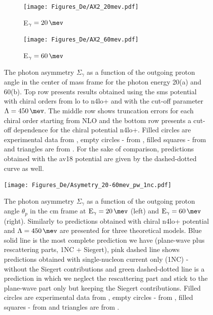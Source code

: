     \begin{figure}[h]
        \centering
        \begin{subfigure}[b]{0.46\textwidth}
            \caption{\small E$_\gamma = \SI{20}{\mev}$}
            \texttt{[image: Figures\_De/AX2\_20mev.pdf]}
            \label{AX_20_vert}
        \end{subfigure}
        \begin{subfigure}[b]{0.46\textwidth}
            \caption{\small E$_\gamma = \SI{60}{\mev}$}
            \texttt{[image: Figures\_De/AX2\_60mev.pdf]}
            \label{AX_60_vert}
        \end{subfigure}
        \caption{The photon asymmetry $\Sigma_\gamma$ 
        as a function of the outgoing proton angle in the center of mass frame 
        for the photon energy \SI{20}{\mev}(a) and \SI{60}{\mev}(b).
        Top row presents results obtained using the \gls{sms} potential
        with chiral orders from \gls{lo} to \gls{n4lo+} and with the cut-off parameter $\Lambda=\SI{450}{\mev}$.
        The middle row shows truncation errors for each 
        chiral order starting from NLO and the
        bottom row presents a cut-off dependence for the chiral potential \gls{n4lo+}.
        Filled circles are experimental data from \cite{KRAUSE1992_asymetry},
        empty circles - from \cite{depascale_asymmetry}, filled squares
        - from \cite{Barannik_asymetry} and triangles are from \cite{Vnukov_asymmetry}.
        For the sake of comparison, predictions obtained with the \gls{av18} potential are
        given by the dashed-dotted curve as well.}
        \label{assymetry}
    \end{figure}


    \begin{figure}[h]
        \begin{center}
        \texttt{[image: Figures\_De/Asymetry\_20-60mev\_pw\_1nc.pdf]}
        \end{center}
        \caption{The photon asymmetry $\Sigma_\gamma$ as a function of the
        outgoing proton angle $\theta_p$ in the \gls{cm} frame at $\text{E}_\gamma = \SI{20}{\mev}$
        (left) and $\text{E}_\gamma = \SI{60}{\mev}$(right).
        Similarly to  predictions obtained with chiral \gls{n4lo+} potential
        and $\Lambda=\SI{450}{\mev}$ are presented for three theoretical models.
        Blue solid line is the most complete prediction we have (plane-wave plus rescattering parts, 1NC + Siegert), pink dashed line shows predictions obtained with
        single-nucleon current only (1NC) - without the Siegert contributions and green dashed-dotted line
        is a prediction in which we neglect the rescattering part
        and stick to the plane-wave part only but keeping the Siegert contributions.
        Filled circles are experimental data from \cite{KRAUSE1992_asymetry},
        empty circles - from \cite{depascale_asymmetry}, filled squares
        - from \cite{Barannik_asymetry} and triangles are from \cite{Vnukov_asymmetry}.}
        \label{asymmetry_energy_1NC}
    \end{figure}

